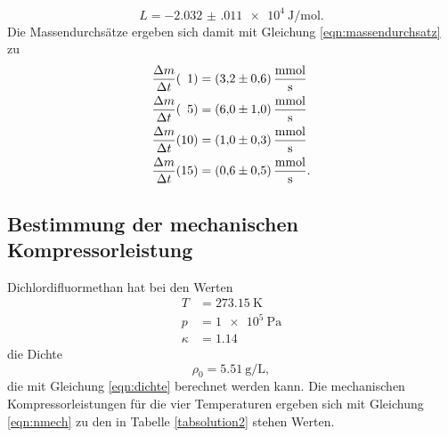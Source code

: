 \begin{equation*}
    L = \SI{-2.032(011)e4}{\joule\per\mol}. %
\end{equation*}
Die Massendurchsätze ergeben sich damit mit Gleichung \eqref{eqn:massendurchsatz} zu %
\begin{align*}
    \frac{\Delta m}{\Delta t}(\phantom{1}1) &= \SI{3.2 \pm 0.6}{\milli\mol\per\second} \\
    \frac{\Delta m}{\Delta t}(\phantom{1}5) &= \SI{6.0 \pm 1.0}{\milli\mol\per\second} \\
    \frac{\Delta m}{\Delta t}(10) &= \SI{1.0 \pm 0.3}{\milli\mol\per\second} \\
    \frac{\Delta m}{\Delta t}(15) &= \SI{0.6 \pm 0.5}{\milli\mol\per\second}. %
\end{align*}

\subsection{Bestimmung der mechanischen Kompressorleistung}
Dichlordifluormethan hat bei den Werten
\begin{align*}
    T &= \SI{273.15}{\kelvin} \\
    p &= \SI{1e5}{\pascal} \\
    \kappa &= \num{1.14}
\end{align*}
die Dichte 
\begin{equation*}
    \rho_0 = \SI{5.51}{\gram\per\liter},
\end{equation*}
die mit Gleichung \eqref{eqn:dichte} berechnet werden kann.
Die mechanischen Kompressorleistungen für die vier Temperaturen
ergeben sich mit Gleichung \eqref{eqn:nmech}
zu den in Tabelle \ref{tabsolution2} stehen Werten.
